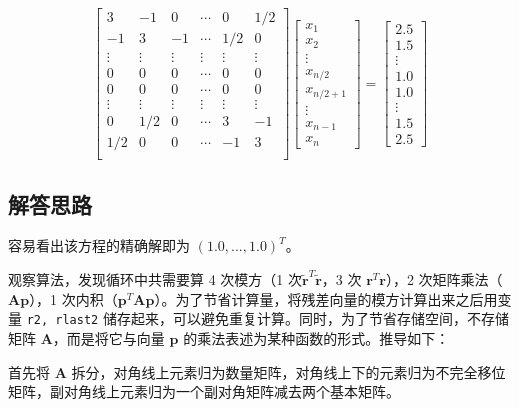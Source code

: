 \documentclass{ctexart}
\begin{document}
\[
\left[\begin{array}{cccccc}
3 & -1 & 0 & \cdots & 0 & 1/2 \\
-1 & 3 & -1 & \cdots & 1/2 & 0 \\
\vdots & \vdots & \vdots & \vdots & \vdots & \vdots \\
0 & 0 & 0 & \cdots & 0 & 0 \\
0 & 0 & 0 & \cdots & 0 & 0 \\
\vdots & \vdots & \vdots & \vdots & \vdots & \vdots \\
0 & 1/2 & 0 & \cdots & 3 & -1 \\
1/2 & 0 & 0 & \cdots & -1 & 3\\
\end{array}\right]
\left[ \begin{array}{c}{x_{1}} \\ {x_{2}} \\ {\vdots} \\ x_{n/2} \\ x_{n/2+1}\\ {\vdots}  \\ {x_{n-1}} \\ {x_{n}}\end{array}\right]=\left[ \begin{array}{c}{2.5} \\ {1.5} \\ {\vdots} \\ {1.0} \\ {1.0} \\ {\vdots} \\ {1.5} \\ {2.5}\end{array}\right]
\]

\subsection{解答思路}
容易看出该方程的精确解即为 $(1.0, ..., 1.0)^T$。

观察算法，发现循环中共需要算 4 次模方（1 次$\tilde{\mathbf r}^T\tilde{\mathbf r}$，3 次 $\mathbf r^T\mathbf r$），2 次矩阵乘法（$\mathbf A\mathbf p$），1 次内积（$\mathbf p^T\mathbf A\mathbf p$）。为了节省计算量，将残差向量的模方计算出来之后用变量 \verb|r2, rlast2| 储存起来，可以避免重复计算。同时，为了节省存储空间，不存储矩阵 $\mathbf A$，而是将它与向量 $\mathbf p$ 的乘法表述为某种函数的形式。推导如下：

首先将 $\mathbf A$ 拆分，对角线上元素归为数量矩阵，对角线上下的元素归为不完全移位矩阵，副对角线上元素归为一个副对角矩阵减去两个基本矩阵。
\end{document}
